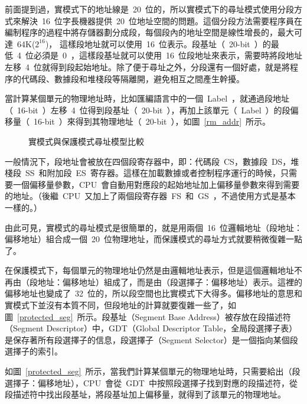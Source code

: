 前面提到過，實模式下的地址線是~20~位的，所以實模式下的尋址模式使用分段方式來解決~16~位字長機器提供~20~位地址空間的問題。這個分段方法需要程序員在編制程序的過程中將存儲器劃分成段，每個段內的地址空間是線性增長的，最大可達~64K($2^16$)，
這樣段地址就可以使用~16~位表示。段基址（~20-bit~）的最低~4~位必須是~0~，這樣段基址就可以使用~16~位段地址來表示，需要時將段地址左移~4~位就得到段起始地址。除了便于尋址之外，分段還有一個好處，就是將程序的代碼段、數據段和堆棧段等隔離開，避免相互之間產生幹擾。

當計算某個單元的物理地址時，比如匯編語言中的一個~Label~，就通過段地址（~16-bit~）左移~4~位得到段基址（~20-bit~），再加上該單元（~Label~）的段偏移量（~16-bit~）來得到其物理地址（~20-bit~），如圖~\ref{rm_addr}~所示。

\begin{figure*}[!t]
\centerline{
\hfil
{}}
\caption{實模式與保護模式尋址模型比較}
\label{real_vs_pro}
\end{figure*}

一般情況下，段地址會被放在四個段寄存器中，即：代碼段~CS，數據段~DS，堆棧段~SS~和附加段~ES~寄存器。這樣在加載數據或者控制程序運行的時候，只需要一個偏移量參數，CPU~會自動用對應段的起始地址加上偏移量參數來得到需要的地址。（後繼~CPU~又加上了兩個段寄存器~FS~和~GS~，不過使用方式是基本一樣的。）

由此可見，實模式的尋址模式是很簡單的，就是用兩個~16~位邏輯地址（段地址：偏移地址）組合成一個~20~位物理地址，而保護模式的尋址方式就要稍微復雜一點了。


在保護模式下，每個單元的物理地址仍然是由邏輯地址表示，但是這個邏輯地址不再由（段地址：偏移地址）組成了，而是由（段選擇子：偏移地址）表示。這裡的偏移地址也變成了~32~位的，所以段空間也比實模式下大得多。偏移地址的意思和實模式下並沒有本質不同，但段地址的計算就要復雜一些了，如圖~\ref{protected_seg}~所示。段基址（Segment Base Address）被存放在段描述符（Segment Descriptor）中，GDT（Global Descriptor Table，全局段選擇子表）是保存著所有段選擇子的信息，段選擇子（Segment Selector）是一個指向某個段選擇子的索引。

如圖~\ref{protected_seg}~所示，當我們計算某個單元的物理地址時，只需要給出（段選擇子：偏移地址），CPU~會從~GDT~中按照段選擇子找到對應的段描述符，從段描述符中找出段基址，將段基址加上偏移量，就得到了該單元的物理地址。

